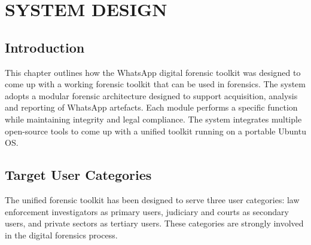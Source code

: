 \documentclass[12pt,a4paper]{report}
\begin{document}
\newpage
\chapter{SYSTEM DESIGN}

\section{Introduction}

This chapter outlines how the WhatsApp digital forensic toolkit was designed to come up with a working forensic toolkit that can be used in forensics. The system adopts a modular forensic architecture designed to support acquisition, analysis and reporting of WhatsApp artefacts. Each module performs a specific function while maintaining integrity and legal compliance. The system integrates multiple open-source tools to come up with a unified toolkit running on a portable Ubuntu OS.

\section{Target User Categories}

The unified forensic toolkit has been designed to serve three user categories: law enforcement investigators as primary users, judiciary and courts as secondary users, and private sectors as tertiary users. These categories are strongly involved in the digital forensics process.
\end{document}
